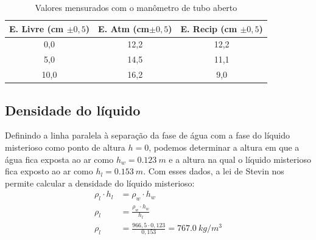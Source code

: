 \begin{table}[H]
    \centering
    \begin{tabular}{c | c | c}
        \hline
        \textbf{E. Livre (cm \(\pm 0,5\))} & \textbf{E. Atm (cm\(\pm 0,5\))} & \textbf{E. Recip (cm \(\pm0,5\))}\\
        \hline
        0,0 & 12,2 & 12,2\\
        \hline
        5,0 & 14,5 & 11,1\\
        \hline
        10,0 & 16,2 & 9,0\\
        \hline
    \end{tabular}
    \caption{Valores mensurados com o manômetro de tubo aberto}
    \label{tab_man}
\end{table}

\subsection{Densidade do líquido}
Definindo a linha paralela à separação da fase de água com a fase do líquido misterioso como ponto de altura \(h = 0\), podemos determinar a altura em que a água fica exposta ao ar como \(h_w = \qty{0,123}{m}\) e a altura na qual o líquido misterioso fica exposto ao ar como \(h_l = \qty{0,153}{m}\). Com esses dados, a lei de Stevin nos permite calcular a densidade do líquido misterioso:
\begin{align*}
    \rho_l \cdot h_l &= \rho_w \cdot h_w\\
    \rho_l &= \frac{\rho_w \cdot h_w}{h_l}\\
    \rho_l &= \frac{966,5 \cdot 0,123}{0,153} = \qty{767,0}{kg/m^3} 
\end{align*}
